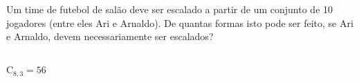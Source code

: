 \begin{ex}
 Um time de futebol de salão deve ser escalado a partir de um conjunto de 10 jogadores (entre eles Ari e Arnaldo). De quantas formas isto pode ser feito, se Ari e Arnaldo, devem necessariamente ser escalados?
   \begin{sol}
     \phantom{A}\\
     $\mathrm{C}_{8,3}=56$
   \end{sol}
\end{ex}